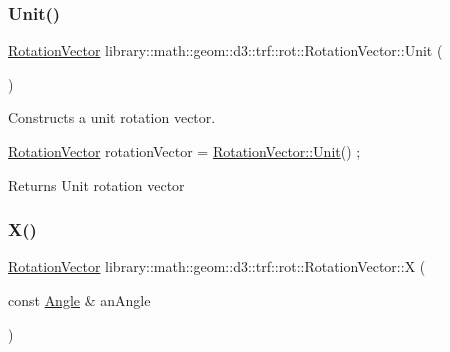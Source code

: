 \subsubsection{\texorpdfstring{Unit()}{Unit()}}
{\footnotesize\ttfamily \hyperlink{classlibrary_1_1math_1_1geom_1_1d3_1_1trf_1_1rot_1_1_rotation_vector}{Rotation\+Vector} library\+::math\+::geom\+::d3\+::trf\+::rot\+::\+Rotation\+Vector\+::\+Unit (\begin{DoxyParamCaption}{ }\end{DoxyParamCaption})\hspace{0.3cm}{\ttfamily [static]}}



Constructs a unit rotation vector. 


\begin{DoxyCode}
\hyperlink{classlibrary_1_1math_1_1geom_1_1d3_1_1trf_1_1rot_1_1_rotation_vector_a49076a279f457fdb14c4a9d4d61e1738}{RotationVector} rotationVector = \hyperlink{classlibrary_1_1math_1_1geom_1_1d3_1_1trf_1_1rot_1_1_rotation_vector_ae8dcd99b54ffcffee6906b526a8d2769}{RotationVector::Unit}() ;
\end{DoxyCode}


\begin{DoxyReturn}{Returns}
Unit rotation vector 
\end{DoxyReturn}
\mbox{\label{classlibrary_1_1math_1_1geom_1_1d3_1_1trf_1_1rot_1_1_rotation_vector_a6b4cb091dd380a071faa158cbdd1b7ea}} 
\subsubsection{\texorpdfstring{X()}{X()}}
{\footnotesize\ttfamily \hyperlink{classlibrary_1_1math_1_1geom_1_1d3_1_1trf_1_1rot_1_1_rotation_vector}{Rotation\+Vector} library\+::math\+::geom\+::d3\+::trf\+::rot\+::\+Rotation\+Vector\+::X (\begin{DoxyParamCaption}\item[{const \hyperlink{classlibrary_1_1math_1_1geom_1_1_angle}{Angle} \&}]{an\+Angle }\end{DoxyParamCaption})\hspace{0.3cm}{\ttfamily [static]}}



